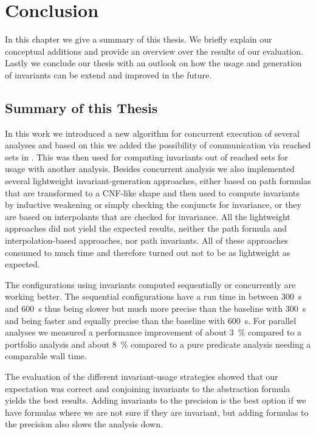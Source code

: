 \chapter{Conclusion}
In this chapter we give a summary of this thesis. We briefly explain our conceptual additions and provide an overview over the results of our evaluation.
Lastly we conclude our thesis with an outlook on how the usage and generation of invariants can be extend and improved in the future.

\section{Summary of this Thesis}
In this work we introduced a new algorithm for concurrent execution of several analyses and based on this we added the possibility of communication via reached sets
in \CPAchecker{}. This was then used for computing 
invariants out of reached sets for usage with another analysis. Besides concurrent analysis we also implemented several lightweight invariant-generation approaches, either based on path formulas that 
are transformed to a \ac{CNF}-like shape and then used to compute invariants by inductive weakening or simply checking the conjuncts for invariance, or they are based on interpolants that are checked for 
invariance. All the lightweight approaches did not yield the expected results, neither the path formula and interpolation-based approaches, nor path invariants. All of these approaches consumed to much time and
therefore turned out not to be as lightweight as expected.

The configurations using invariants computed sequentially or concurrently are working better. The sequential configurations have a run time in
between \SI{300}{\second} and \SI{600}{\second} thus being slower but much more precise than the baseline with \SI{300}{\second} and being 
faster and equally precise than the baseline with \SI{600}{\second}. For parallel analyses we measured a performance improvement of about
\SI{3}{\percent} compared to a portfolio analysis and about \SI{8}{\percent} compared to a pure predicate analysis needing a comparable wall time.

The evaluation of the different invariant-usage strategies showed that our expectation was correct and conjoining invariants to the abstraction
formula yields the best results. Adding invariants to the precision is the best option if we have formulas where we are not sure if they are
invariant, but adding formulas to the precision also slows the analysis down.

